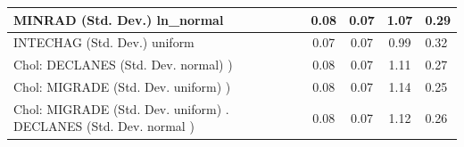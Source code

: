 \begin{table}
\begin{center}
\begin{tabular}{|l|l|c|c|c|l|}
			\hline
			MINRAD (Std. Dev.) ln_normal &  & 0.08 & 0.07 & 1.07 & 0.29 \\
			\hline
			INTECHAG (Std. Dev.) uniform &  & 0.07 & 0.07 & 0.99 & 0.32 \\
			\hline
			 Chol: DECLANES (Std. Dev. normal) ) &  & 0.08 & 0.07 & 1.11 & 0.27 \\
			\hline
			 Chol: MIGRADE (Std. Dev. uniform) ) &  & 0.08 & 0.07 & 1.14 & 0.25 \\
			\hline
			 Chol: MIGRADE (Std. Dev. uniform) . DECLANES (Std. Dev.   normal ) &  & 0.08 & 0.07 & 1.12 & 0.26 \\
			\hline
		\end{tabular}
	\end{center}
\end{table}